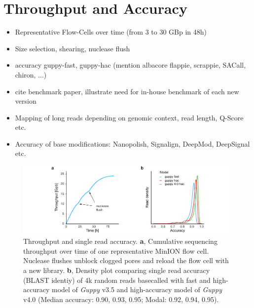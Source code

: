 \section{Throughput and Accuracy}
\label{sec:stat_of_art:throughput}

\begin{itemize}
    \item Representative Flow-Cells over time (from 3 to 30 GBp in 48h)
    \item Size selection, shearing, nuclease flush
    \item accuracy guppy-fast, guppy-hac (mention albacore flappie, scrappie, SACall, chiron, ...)
    \item cite benchmark paper, illustrate need for in-house benchmark of each new version
    \item Mapping of long reads depending on genomic context, read length, Q-Score etc.
    \item Accuracy of base modifications: Nanopolish, Signalign, DeepMod, DeepSignal etc.
\end{itemize}

\begin{figure}[h]
    \centering
    \includegraphics[width=1.0\textwidth]{figures/state_of_art/throughput.pdf}
    \captionsetup{format=plain}
    \caption[Throughput and accuracy]{Throughput and single read accuracy. \textbf{a}, Cumulative sequencing throughput over time of one representative MinION flow cell. Nuclease flushes unblock clogged pores and reload the flow cell with a new library. \textbf{b}, Density plot comparing single read accuracy (BLAST identiy) of 4k random reads basecalled with fast and high-accuracy model of \textit{Guppy} v3.5 and high-accuracy model of \textit{Guppy} v4.0 (Median accuracy: 0.90, 0.93, 0.95; Modal: 0.92, 0.94, 0.95).}
    \label{fig:state_of_art:throughput}
\end{figure}

